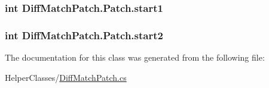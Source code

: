 \subsubsection[{start1}]{\setlength{\rightskip}{0pt plus 5cm}int Diff\+Match\+Patch.\+Patch.\+start1}\label{class_diff_match_patch_1_1_patch_a6c57df6dfdffba89a860ca8eaffea9f0}
\hypertarget{class_diff_match_patch_1_1_patch_aef356b2b84634d28f4cddafef71514eb}{}
\subsubsection[{start2}]{\setlength{\rightskip}{0pt plus 5cm}int Diff\+Match\+Patch.\+Patch.\+start2}\label{class_diff_match_patch_1_1_patch_aef356b2b84634d28f4cddafef71514eb}


The documentation for this class was generated from the following file\+:\begin{DoxyCompactItemize}
\item 
Helper\+Classes/\hyperlink{_diff_match_patch_8cs}{Diff\+Match\+Patch.\+cs}\end{DoxyCompactItemize}
